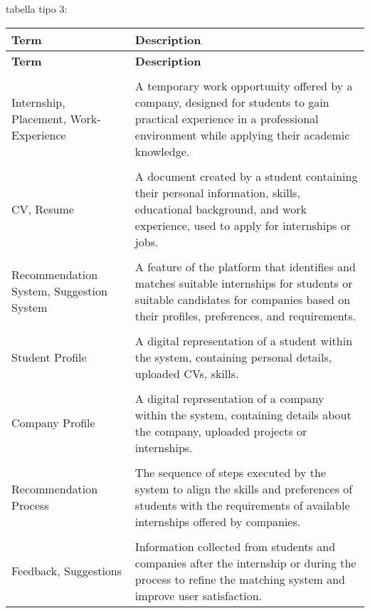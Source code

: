     tabella tipo 3:

\begin{longtable}{p{}p{}}
    \textbf{\large Term} & \textbf{\large Description} \\
    \hline
    \endfirsthead
    \textbf{\large Term} & \textbf{\large Description} \\
    \hline
    \endhead

    \vspace{0.5em}\\
    Internship, Placement, Work-Experience & A temporary work opportunity offered by a company, designed for students to gain practical experience in a professional environment while applying their academic knowledge. \\
    \vspace{0.5em}\\
    CV, Resume & A document created by a student containing their personal information, skills, educational background, and work experience, used to apply for internships or jobs. \\
    \vspace{0.5em}\\
    Recommendation System, Suggestion System & A feature of the platform that identifies and matches suitable internships for students or suitable candidates for companies based on their profiles, preferences, and requirements. \\
    \vspace{0.5em}\\
    Student Profile & A digital representation of a student within the system, containing personal details, uploaded CVs, skills. \\
    \vspace{0.5em}\\
    Company Profile & A digital representation of a company within the system, containing details about the company, uploaded projects or internships. \\
    \vspace{0.5em}\\
    Recommendation Process & The sequence of steps executed by the system to align the skills and preferences of students with the requirements of available internships offered by companies. \\
    \vspace{0.5em}\\
    Feedback, Suggestions & Information collected from students and companies after the internship or during the process to refine the matching system and improve user satisfaction. \\

\end{longtable}
